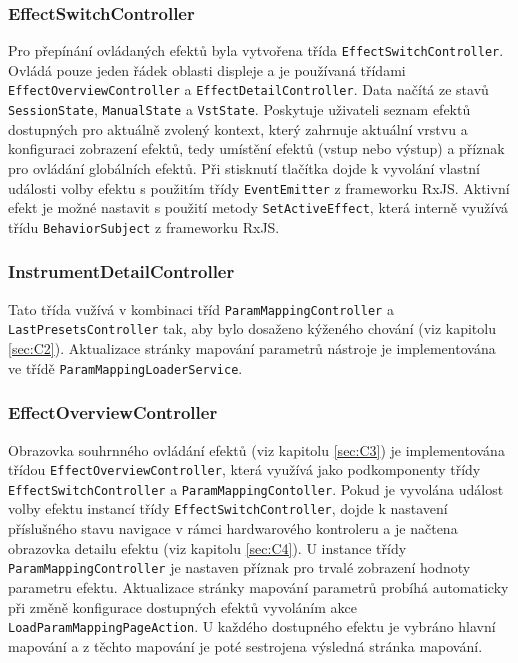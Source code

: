 \documentclass[thesis=M,czech]{FITthesis}[2019/03/06]
\begin{document}
			\subsubsection{EffectSwitchController}
				Pro přepínání ovládaných efektů byla vytvořena třída \texttt{Effect\-Switch\-Controller}. 
				Ovládá pouze jeden řádek oblasti displeje a je používaná třídami \texttt{Effect\-Overview\-Controller} a \texttt{Effect\-Detail\-Controller}. Data načítá ze stavů \texttt{SessionState}, \texttt{ManualState} a \texttt{VstState}.
				Poskytuje uživateli seznam efektů dostupných pro aktuálně zvolený kontext, který zahrnuje aktuální vrstvu a konfiguraci
				zobrazení efektů, tedy umístění efektů (vstup nebo výstup) a příznak pro ovládání globálních efektů.
				Při stisknutí tlačítka dojde k vyvolání vlastní události volby efektu s použitím třídy \texttt{EventEmitter} z frameworku RxJS. Aktivní efekt je možné nastavit s použití metody \texttt{Set\-Active\-Effect}, která interně využívá
				třídu \texttt{BehaviorSubject} z frameworku RxJS.			
							
			\subsubsection{InstrumentDetailController}
				Tato třída vužívá v kombinaci tříd \texttt{Param\-Mapping\-Controller} a \texttt{Last\-Presets\-Controller} tak, aby bylo dosaženo kýženého chování (viz kapitolu \ref{sec:C2}).
				Aktualizace stránky mapování parametrů nástroje je implementována ve třídě \texttt{Param\-Mapping\-Loader\-Service}.
				
			\subsubsection{EffectOverviewController}
				Obrazovka souhrnného ovládání efektů (viz kapitolu \ref{sec:C3}) je implementována třídou \texttt{Effect\-Overview\-Controller},
				která využívá jako podkomponenty třídy \texttt{Effect\-Switch\-Controller} a \texttt{Param\-Mapping\-Contoller}.
				Pokud je vyvolána událost volby efektu instancí třídy \texttt{Effect\-Switch\-Controller}, dojde k nastavení příslušného stavu navigace v rámci hardwarového kontroleru a je načtena obrazovka detailu efektu (viz kapitolu \ref{sec:C4}).
				U instance třídy \texttt{Param\-Mapping\-Controller} je nastaven příznak pro trvalé zobrazení hodnoty parametru efektu.
				Aktualizace stránky mapování parametrů probíhá automaticky při změně konfigurace dostupných efektů vyvoláním akce \texttt{Load\-Param\-Mapping\-Page\-Action}. U každého dostupného efektu je vybráno hlavní mapování a z těchto mapování
				je poté sestrojena výsledná stránka mapování. 			
				
\end{document}
